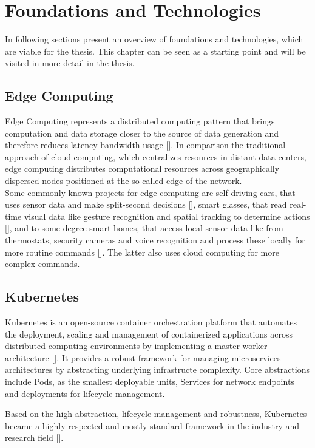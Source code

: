 \chapter{Foundations and Technologies}
In following sections present an overview of foundations and technologies, which are viable for the thesis.
This chapter can be seen as a starting point and will be visited in more detail in the thesis.

\section{Edge Computing}
Edge Computing represents a distributed computing pattern that brings computation and data storage closer to the source of data generation and
therefore reduces latency bandwidth usage [\cite{7488250}]. In comparison the traditional approach of cloud computing, which centralizes resources in distant
data centers, edge computing distributes computational resources across geographically dispersed nodes positioned at the so called edge of the network.
\\
Some commonly known projects for edge computing are self-driving cars, that uses sensor data and make split-second decisions [\cite{9546662}], 
smart glasses, that read real-time visual data like gesture recognition and spatial tracking to determine actions [\cite{10134901}], and to some degree smart homes, that access local sensor data like from thermostats, security cameras and voice recognition and process these locally for more routine commands [\cite{7488250}].
The latter also uses cloud computing for more complex commands.

\section{Kubernetes}
Kubernetes is an open-source container orchestration platform that automates the deployment, scaling and management of containerized applications across distributed computing environments by implementing a master-worker architecture [\cite{10.5555/3175917}].
It provides a robust framework for managing microservices architectures by abstracting underlying infrastructe complexity.
Core abstractions include Pods, as the smallest deployable units, Services for network endpoints and deployments for lifecycle management.

Based on the high abstraction, lifecycle management and robustness, Kubernetes became a highly respected and mostly standard framework in the industry and research field [\cite{10.1145/3539606}].

